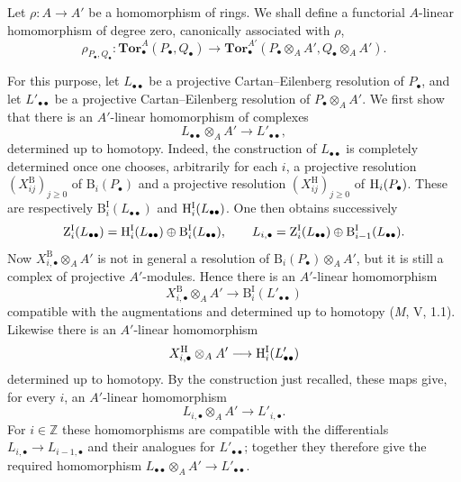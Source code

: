 \begin{env}[6.3.8]
\label{III.6.3.8}
Let $\rho:A\longrightarrow A'$ be a homomorphism of rings.  We
shall define a functorial $A$-linear homomorphism of degree zero,
canonically associated with $\rho$,
\[
  \rho_{P_\bullet,Q_\bullet}:
  \mathbf{Tor}_\bullet^A(P_\bullet,Q_\bullet)
  \longrightarrow
  \mathbf{Tor}_\bullet^{A'}
  (P_\bullet\otimes_AA',Q_\bullet\otimes_AA').
  \tag{6.3.8.1}\label{III.6.3.8.1}
\]

For this purpose, let $L_{\bullet\bullet}$ be a projective
Cartan--Eilenberg resolution of $P_\bullet$, and let
$L'_{\bullet\bullet}$ be a projective Cartan--Eilenberg resolution
of $P_\bullet\otimes_AA'$.  We first show that there is an
$A'$-linear homomorphism of complexes
\[
  L_{\bullet\bullet}\otimes_AA'
  \longrightarrow L'_{\bullet\bullet},
\]
determined up to homotopy.  Indeed, the construction of
$L_{\bullet\bullet}$ is completely determined once one chooses,
arbitrarily for each $i$, a projective resolution
$(X_{ij}^{\mathrm B})_{j\geq0}$ of $\mathrm B_i(P_\bullet)$ and a
projective resolution $(X_{ij}^{\mathrm H})_{j\geq0}$ of
$\mathrm{H}_i(P_\bullet)$.  These are respectively
$\mathrm B_i^{\mathrm I}(L_{\bullet\bullet})$ and
$\mathrm{H}_i^{\mathrm I}(L_{\bullet\bullet})$.  One then obtains
successively
\[
  \mathrm Z_i^{\mathrm I}(L_{\bullet\bullet})
  =
  \mathrm{H}_i^{\mathrm I}(L_{\bullet\bullet})
  \oplus
  \mathrm B_i^{\mathrm I}(L_{\bullet\bullet}),
  \qquad
  L_{i,\bullet}
  =
  \mathrm Z_i^{\mathrm I}(L_{\bullet\bullet})
  \oplus
  \mathrm B_{i-1}^{\mathrm I}(L_{\bullet\bullet}).
\]
Now $X_{i,\bullet}^{\mathrm B}\otimes_AA'$ is not in general a
resolution of $\mathrm B_i(P_\bullet)\otimes_AA'$, but it is still
a complex of projective $A'$-modules.  Hence there is an
$A'$-linear homomorphism
\[
  X_{i,\bullet}^{\mathrm B}\otimes_AA'
  \longrightarrow
  \mathrm B_i^{\mathrm I}(L'_{\bullet\bullet})
\]
compatible with the augmentations and determined up to homotopy
(\emph{M}, V, 1.1).  Likewise there is an $A'$-linear homomorphism
\[
  X_{i,\bullet}^{\mathrm H}\otimes_AA'
  \longrightarrow
  \mathrm{H}_i^{\mathrm I}(L'_{\bullet\bullet})
\]
determined up to homotopy.  By the construction just recalled,
these maps give, for every $i$, an $A'$-linear homomorphism
\[
  L_{i,\bullet}\otimes_AA'\longrightarrow L'_{i,\bullet}.
\]
For $i\in\mathbb Z$ these homomorphisms are compatible with the
differentials $L_{i,\bullet}\longrightarrow L_{i-1,\bullet}$ and
their analogues for $L'_{\bullet\bullet}$; together they therefore
give the required homomorphism
$L_{\bullet\bullet}\otimes_AA'\longrightarrow L'_{\bullet\bullet}$.


\end{env}
